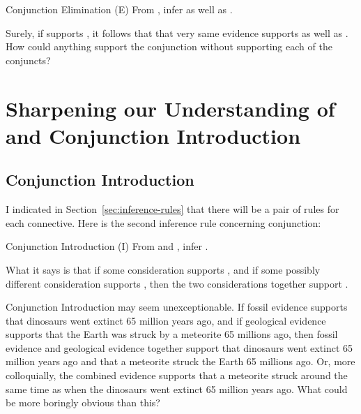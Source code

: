 \begin{infrule}
 \item[Conjunction Elimination (\p{\land}E)] From , infer  as well as .
\end{infrule}

Surely, if \p{\Lambda} supports , it follows that that very same 
evidence supports  as well as .  How could anything support the 
conjunction without supporting each of the conjuncts? 






\section{Sharpening our Understanding of \p{\lproves} and Conjunction 
Introduction}
\label{sec:conjI}

\subsection{Conjunction Introduction}

I indicated in Section~\ref{sec:inference-rules} that there will be a pair of 
rules for each connective. Here is the second inference rule concerning 
conjunction:


\begin{infrule}
 \item[Conjunction Introduction (\p{\land}I)] From  and 
  , infer .
\end{infrule}

What it says is that if some consideration supports , and if some 
possibly different consideration supports , then the two considerations 
together support . 

Conjunction Introduction may seem unexceptionable. If fossil evidence supports 
that dinosaurs went extinct 65 million years ago, and if geological evidence 
supports that the Earth was struck by a meteorite 65 millions ago, then fossil 
evidence and geological evidence together support that dinosaurs went extinct 65 
million years ago and that a meteorite struck the Earth 65 millions ago. Or, 
more colloquially, the combined evidence supports that a meteorite struck around 
the same time as when the dinosaurs went extinct 65 million years ago. What 
could be more boringly obvious than this?

